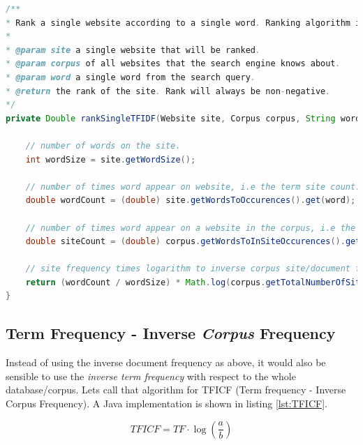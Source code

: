 \begin{lstlisting}[language=Java, caption=This is a code example., label=lst:TFIDF]
/**
* Rank a single website according to a single word. Ranking algorithm is TFIDF.
* 
* @param site a single website that will be ranked.
* @param corpus of all websites that the search engine knows about.
* @param word a single word from the search query.
* @return the rank of the site. Rank will always be non-negative.
*/
private Double rankSingleTFIDF(Website site, Corpus corpus, String word) {

	// number of words on the site.
	int wordSize = site.getWordSize();
	
	// number of times word appear on website, i.e the term site count.
	double wordCount = (double) site.getWordsToOccurences().get(word);
	
	// number of times word appear on a website in the corpus, i.e the site/document count.
	double siteCount = (double) corpus.getWordsToInSiteOccurences().get(word);
	
	// site frequency times logarithm to inverse corpus site/document frequency.
	return (wordCount / wordSize) * Math.log(corpus.getTotalNumberOfSites() / siteCount);
}
\end{lstlisting}


\subsection{Term Frequency - Inverse \emph{Corpus} Frequency}
Instead of using the inverse document frequency as above, it would also be sensible to use the \emph{inverse term frequency} with respect to the whole database/corpus. Lets call that algorithm for TFICF (Term frequency - Inverse Corpus Frequency). A Java implementation is shown in listing \ref{lst:TFICF}.
    
\[ TFICF = TF \cdot \log{\left( \frac{a}{b} \right) } \]


